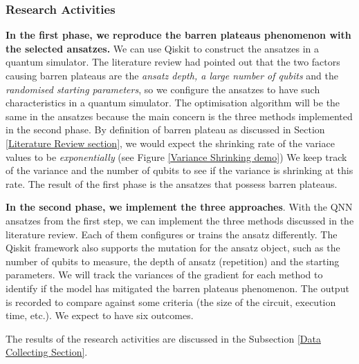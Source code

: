 \subsubsection{Research Activities} \label{Research Activities section}
\textbf{In the first phase, we reproduce the barren plateaus phenomenon with the selected ansatzes.}
We can use Qiskit \cite{Qiskit} to construct the ansatzes in a quantum simulator.
The literature review had pointed out that the two factors causing barren plateaus are the \textit{ansatz depth, a large number of qubits} and the \textit{randomised starting parameters}, so we configure the ansatzes to have such characteristics in a quantum simulator.
The optimisation algorithm will be the same in the ansatzes because the main concern is the three methods implemented in the second phase.
By definition of barren plateau as discussed in Section \ref{Literature Review section}, we would expect the shrinking rate of the variace values to be \textit{exponentially} (see Figure \ref{Variance Shrinking demo})
We keep track of the variance and the number of qubits to see if the variance is shrinking at this rate.
The result of the first phase is the ansatzes that possess barren plateaus.

\textbf{In the second phase, we implement the three approaches}.
With the QNN ansatzes from the first step, we can implement the three methods discussed in the literature review.
Each of them configures or trains the ansatz differently.
The Qiskit framework also supports the mutation for the ansatz object, such as the number of qubits to measure, the depth of ansatz (repetition) and the starting parameters.
We will track the variances of the gradient for each method to identify if the model has mitigated the barren plateaus phenomenon.
The output is recorded to compare against some criteria (the size of the circuit, execution time, etc.).
We expect to have six outcomes.

The results of the research activities are discussed in the Subsection \ref{Data Collecting Section}.

